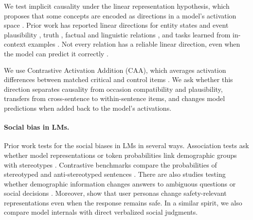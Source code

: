 \documentclass[11pt]{article}
\begin{document}
We test implicit causality under the linear representation hypothesis, which proposes that some concepts are encoded as directions in a model's activation space \citep{park-etal-2024-linear}. Prior work has reported linear directions for entity states and event plausibility \citep{li-etal-2021-implicit,lepori-etal-2026-fantasy}, truth \citep{marks-tegmark-2024-geometry}, factual and linguistic relations \citep{hernandez-etal-2024-linearity}, and tasks learned from in-context examples \citep{todd-etal-2024-function}. Not every relation has a reliable linear direction, even when the model can predict it correctly \citep{hernandez-etal-2024-linearity}. 

We use Contrastive Activation Addition (CAA), which averages activation differences between matched critical and control items \citep{rimsky-etal-2024-steering}. We ask whether this direction separates causality from occasion compatibility and plausibility, transfers from cross-sentence to within-sentence items, and changes model predictions when added back to the model's activations.

\paragraph{Social bias in LMs.}

Prior work tests for the social biases in LMs in several ways. Association tests ask whether model representations or token probabilities link demographic groups with stereotypes \citep{may-etal-2019-measuring,kurita-etal-2019-measuring}. Contrastive benchmarks compare the probabilities of stereotyped and anti-stereotyped sentences \citep{nadeem-etal-2021-stereoset,nangia-etal-2020-crows}. There are also studies testing whether demographic information changes answers to ambiguous questions or social decisions \citep{parrish-etal-2022-bbq,tamkin-etal-2023-discrimination}. Moreover, \citet{ghandeharioun-etal-2024-whos} show that user personas change safety-relevant representations even when the response remains safe. In a similar spirit, we also compare model internals with direct verbalized social judgments. 

\end{document}
